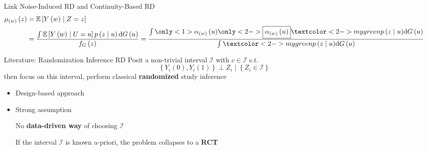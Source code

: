 \begin{frame}{Link Noise-Induced RD and Continuity-Based RD}
    \begin{align*}
        \mu_{\left(w\right)}\left(z\right)&=\mathbb{E}\left[Y\left(w\right)\mid Z=z\right]\\
        & =\frac{\int\mathbb{E}\left[Y\left(w\right)\mid U=u\right]p\left(z\mid u\right)\mathrm{d}G\left(u\right)}{f_{G}\left(z\right)} = \frac{\int \only<1>{\alpha_{\left(w\right)}\left(u\right)} \only<2->{\boxed{\alpha_{\left(w\right)}\left(u\right)}} \textcolor<2->{mygreen}{p\left(z\mid u\right)} \mathrm{d}G\left(u\right)}{\int \textcolor<2->{mygreen}{p\left(z\mid u\right)}\mathrm{d}G\left(u\right)}
    \end{align*}


    
\end{frame}

\begin{frame}{Literature: Randomization Inference RD}
    Posit a non-trivial interval $\mathcal{I}$ with $c\in\mathcal{I}$ s.t.
    $$
    \left\{ Y_{i}\left(0\right),Y_{i}\left(1\right)\right\} \perp Z_i \mid \left\{ Z_{i}\in\mathcal{I}\right\}
    $$
    then focus on this interval, perform classical \textcolor{mygreen}{\textbf{randomized}} study inference

    
        \begin{itemize}
            \item<2-> Design-based approach {\footnotesize\citep{rubin2008objective}}
            \item<3-> Strong assumption
            
            No \textcolor{mygreen}{\textbf{data-driven way}} of choosing $\mathcal{I}$
                    
            If the interval $\mathcal{I}$ is known a-priori, the problem collapses to a \textcolor{mygreen}{\textbf{RCT}}
        \end{itemize}
    
\end{frame}

